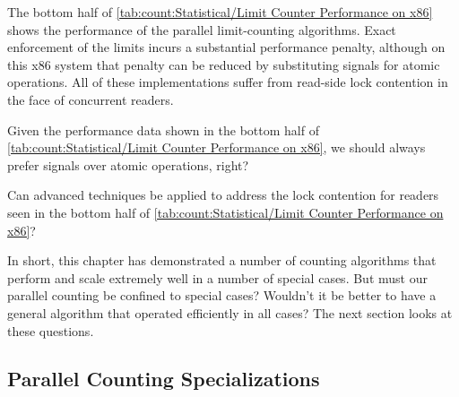 The bottom half of \cref{tab:count:Statistical/Limit Counter Performance on x86}
shows the performance of the parallel limit-counting algorithms.
Exact enforcement of the limits incurs a substantial performance
penalty, although on this x86 system that penalty can be reduced
by substituting signals for atomic operations.
All of these implementations suffer from read-side lock contention
in the face of concurrent readers.

\QuickQuiz{}
	Given the performance data shown in the bottom half of
	\cref{tab:count:Statistical/Limit Counter Performance on x86},
	we should always prefer signals over atomic operations, right?
 \QuickQuizEnd

\QuickQuiz{}
	Can advanced techniques be applied to address the lock
	contention for readers seen in the bottom half of
	\cref{tab:count:Statistical/Limit Counter Performance on x86}?
 \QuickQuizEnd

In short, this chapter has demonstrated a number of counting algorithms
that perform and scale extremely well in a number of special cases.
But must our parallel counting be confined to special cases?
Wouldn't it be better to have a general algorithm that operated
efficiently in all cases?
The next section looks at these questions.

\subsection{Parallel Counting Specializations}
\label{sec:count:Parallel Counting Specializations}

